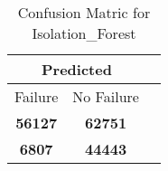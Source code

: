 \begin{table}[] 
\caption{Confusion Matric for Isolation_Forest} 
\label{Table: Prediction Accuracy-NoneIsolation_ForestOnlySunEKF-ignoreReflection100.9EKF-top2-Reflection} 
\centering 
\begin{tabular} 
 {@{}ccc@{}} 
\toprule 
\multicolumn{2}{c}{\textbf{Predicted}}
 \\ \midrule 
\multicolumn{1}{|c|}{Failure} & 
\multicolumn{1}{c|}{No Failure}
 \\ \midrule 
\multicolumn{1}{|c|}{\color{green}\textbf{56127}} & 
\multicolumn{1}{c|}{\color{green}\textbf{62751}}
 \\ \midrule 
\multicolumn{1}{|c|}{\color{red}\textbf{6807}} & 
\multicolumn{1}{c|}{\color{red}\textbf{44443}}
 \\ \bottomrule 
\end{tabular} 
\end{table} 

